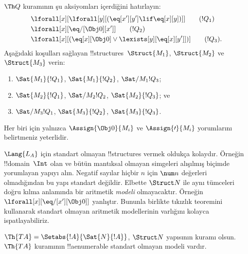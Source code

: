 \documentclass[../../../include/open-logic-section]{subfiles}
\begin{document}
\begin{prob}
$\Th Q$ kuramının şu aksiyomları içerdiğini hatırlayın:
\begin{align*}
& \lforall[x][\lforall[y][(\eq[x'][y'] \lif \eq[x][y])]] \tag{$!Q_1$}\\
& \lforall[x][\eq/[\Obj 0][x']] \tag{$!Q_2$}\\
& \lforall[x][(\eq[x][\Obj 0] \lor \lexists[y][\eq[x][y']])] \tag{$!Q_3$}.
\end{align*}
Aşağıdaki koşulları sağlayan !!{structure}s~$\Struct{M_1}$,
$\Struct{M_2}$ ve $\Struct{M_3}$ verin:
\begin{enumerate}
\item $\Sat{M_1}{!Q_1}$, $\Sat{M_1}{!Q_2}$, $\Sat/{M_1}{!Q_3}$;
\item $\Sat{M_2}{!Q_1}$, $\Sat/{M_2}{!Q_2}$, $\Sat{M_2}{!Q_3}$; ve
\item $\Sat/{M_3}{!Q_1}$, $\Sat{M_3}{!Q_2}$, $\Sat{M_3}{!Q_3}$.
\end{enumerate}
Her biri için yalnızca $\Assign{\Obj0}{M_i}$ ve
$\Assign{\prime}{M_i}$ yorumlarını belirtmeniz yeterlidir.
\end{prob}

\begin{explain}
$\Lang{L_A}$ için standart olmayan !!{structure}s vermek oldukça
kolaydır. Örneğin !!{domain}~$\Int$ olan ve bütün mantıksal olmayan
simgeleri alışılmış biçimde yorumlayan yapıyı alın. Negatif sayılar
hiçbir $n$ için $\num n$ değerleri olmadığından bu yapı standart
değildir. Elbette $\Struct N$ ile aynı tümceleri doğru kılma anlamında
bir aritmetik \emph{modeli} olmayacaktır. Örneğin
$\lforall[x][\eq/[x'][\Obj0]]$ yanlıştır. Bununla birlikte tıkızlık
teoremini kullanarak standart olmayan aritmetik modellerinin varlığını
kolayca ispatlayabiliriz.
\end{explain}

\begin{prop}
$\Th{TA}=\Setabs{!A}{\Sat{N}{!A}}$, $\Struct N$ yapısının kuramı olsun.
$\Th{TA}$ kuramının !!a{enumerable} standart olmayan modeli vardır.
\end{prop}
\end{document}
